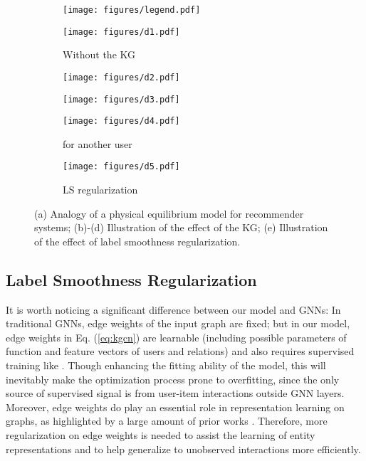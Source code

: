 \documentclass[sigconf]{acmart}
\begin{document}
	
	\begin{figure*}
			\centering
			\begin{subfigure}[b]{0.9\textwidth}
   				\texttt{[image: figures/legend.pdf]}
			\end{subfigure}
			\hfill
			\begin{subfigure}[b]{0.19\textwidth}
   				\texttt{[image: figures/d1.pdf]}
   				\caption{Without the KG}
   				\label{fig:d1}
			\end{subfigure}
			\hfill
			\begin{subfigure}[b]{0.19\textwidth}
				\texttt{[image: figures/d2.pdf]}
				\caption{}
				\label{fig:d2}
			\end{subfigure}
			\hfill
			\begin{subfigure}[b]{0.19\textwidth}
   				\texttt{[image: figures/d3.pdf]}
   				\caption{}
   				\label{fig:d3}
			\end{subfigure}
			\hfill
			\begin{subfigure}[b]{0.19\textwidth}
				\texttt{[image: figures/d4.pdf]}
				\caption{ for another user}
				\label{fig:d4}
			\end{subfigure}
			\hfill
			\begin{subfigure}[b]{0.19\textwidth}
				\texttt{[image: figures/d5.pdf]}
				\caption{LS regularization}
				\label{fig:d5}
			\end{subfigure}
			\caption{(a) Analogy of a physical equilibrium model for recommender systems; (b)-(d) Illustration of the effect of the KG; (e) Illustration of the effect of label smoothness regularization.}
			\label{fig:discussion}
		\end{figure*}
		
	\subsection{Label Smoothness Regularization}
		It is worth noticing a significant difference between our model and GNNs: In traditional GNNs, edge weights of the input graph are fixed; but in our model, edge weights  in Eq. (\ref{eq:kgcn}) are learnable (including possible parameters of function  and feature vectors of users and relations) and also requires supervised training like .
		Though enhancing the fitting ability of the model, this will inevitably make the optimization process prone to overfitting, since the only source of supervised signal is from user-item interactions outside GNN layers.
		Moreover, edge weights do play an essential role in representation learning on graphs, as highlighted by a large amount of prior works \cite{zhu2003semi,zhang2007hyperparameter,wang2008label,karasuyama2013manifold,velickovic2017graph}.
		Therefore, more regularization on edge weights is needed to assist the learning of entity representations and to help generalize to unobserved interactions more efficiently.
		
\end{document}
